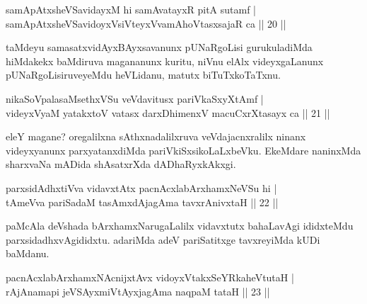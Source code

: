 \centerline{}

\begin{shl}
samApAtxsheVSavidayxM hi samAvatayxR pitA sutamf | \\
samApAtxsheVSavidoyxV\s siVteyxVvamAhoVtasxsajaR ca \hfill|| 20 || 
\end{shl}

\begin{artha}
taMdeyu samasatxvidAyxBAyxsavanunx pUNaRgoLisi gurukuladiMda 
hiMdakekx baMdiruva magananunx kuritu, niVnu elAlx videyxgaLanunx 
pUNaRgoLisiruveyeMdu heVLidanu, matutx biTuTxkoTaTxnu. 
\end{artha}


\begin{shl}
nikaSoVpalasaMsethxVSu veVdavitusx pariVkaSxyXtAmf | \\
videyxVyaM yatakxtoV vatasx darxDhimenxV macuCxrXtasayx ca \hfill|| 21 || 
\end{shl}

\begin{artha}
eleY magane? oregalilxna sAthxnadalilxruva veVdajacnxralilx ninanx 
videyxyanunx parxyatanxdiMda pariVkiSxsikoLaLxbeVku. EkeMdare 
naninxMda sharxvaNa mADida shAsatxrXda dADhaRyxkAkxgi.
\end{artha}


\begin{shl}
parxsidAdhx\s tiVva vidavxtAtx pacnAcxlabArxhamxNeVSu hi | \\
tAmeVva pariSadaM tasAmxdAjagAma tavxrAnivxtaH \hfill|| 22 || 
\end{shl}

\begin{artha}
paMcAla deVshada bArxhamxNarugaLalilx vidavxtutx bahaLavAgi ididxteMdu 
parxsidadhxvAgididxtu. adariMda adeV pariSatitxge tavxreyiMda kUDi 
baMdanu.
\end{artha}


\begin{shl}
pacnAcxlabArxhamxNAcnijxtAvx vidoyxVtakxSeYRkaheVtutaH | \\
rAjAnamapi jeVSAyxmiVtAyxjagAma naqpaM tataH \hfill|| 23 || 
\end{shl}

